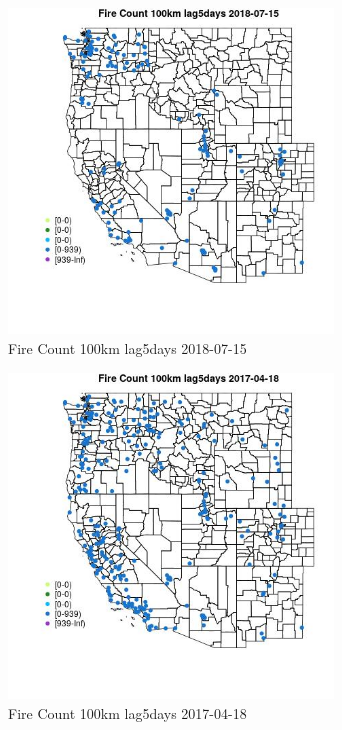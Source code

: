 \begin{figure} 
\centering  
\includegraphics[width=0.77\textwidth]{Code_Outputs/Report_ML_input_PM25_Step4_part_e_de_duplicated_aves_compiled_2019-05-21wNAs_MapObsFire_Count_100km_lag5days2018-07-15.jpg} 
\caption{\label{fig:Report_ML_input_PM25_Step4_part_e_de_duplicated_aves_compiled_2019-05-21wNAsMapObsFire_Count_100km_lag5days2018-07-15}Fire Count 100km lag5days 2018-07-15} 
\end{figure} 
 

\begin{figure} 
\centering  
\includegraphics[width=0.77\textwidth]{Code_Outputs/Report_ML_input_PM25_Step4_part_e_de_duplicated_aves_compiled_2019-05-21wNAs_MapObsFire_Count_100km_lag5days2017-04-18.jpg} 
\caption{\label{fig:Report_ML_input_PM25_Step4_part_e_de_duplicated_aves_compiled_2019-05-21wNAsMapObsFire_Count_100km_lag5days2017-04-18}Fire Count 100km lag5days 2017-04-18} 
\end{figure} 
 

